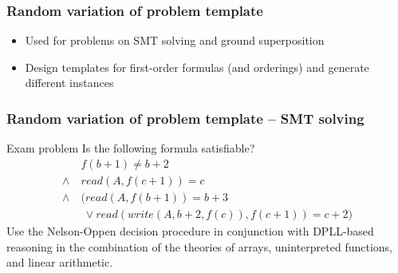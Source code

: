 \documentclass[xcolor={table}]{beamer}
\begin{document}


\begin{frame}
  \frametitle{Random variation of problem template}
\begin{itemize}
\item Used for problems on SMT solving and ground superposition
\item Design templates for first-order formulas (and orderings)
  and generate different instances
\end{itemize}
\end{frame}



\begin{frame}
    \frametitle{Random variation of problem template -- SMT solving}

    \begin{block}{Exam problem}
        Is the following formula satisfiable?
        \begin{align*}
            & f(b+1) \neq b+2 \\
            \land~
            & read(A,f(c+1))=c \\
            \land~
            & \bigl(
                read(A,f(b+1))=b+3 \\
            & ~\lor
                read(write(A,b+2,f(c)),f(c+1))=c+2
              \bigr)
        \end{align*}
        Use the Nelson-Oppen decision procedure
        in conjunction with DPLL-based reasoning
        in the combination of the theories of
        arrays, uninterpreted functions, and linear arithmetic.
    \end{block}
\end{frame}
\end{document}
